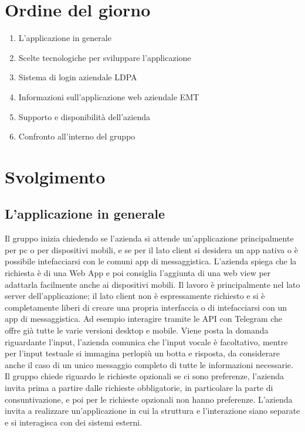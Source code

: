 \documentclass[12pt, a4paper,table]{article}
\begin{document}
	\section{Ordine del giorno}
	\begin{enumerate}
		\item L'applicazione in generale
		\item Scelte tecnologiche per sviluppare l'applicazione
		\item Sistema di login aziendale LDPA
		\item Informazioni sull'applicazione web aziendale EMT
		\item Supporto e disponibilità dell'azienda
		\item Confronto all'interno del gruppo
	\end{enumerate}
	\newpage

	\section{Svolgimento}
		\subsection{L'applicazione in generale}
		Il gruppo inizia chiedendo se l'azienda si attende un'applicazione principalmente 
		per pc o per dispositivi mobili, e se per il lato client si desidera un app nativa 
		o è possibile intefacciarsi con le comuni app di messaggistica. \newline
		L'azienda spiega che la richiesta è di una Web App e poi consiglia l'aggiunta di una 
		web view per adattarla facilmente anche ai dispositivi mobili. Il lavoro è principalmente 
		nel lato server dell'applicazione; il lato client non è espressamente richiesto e si è 
		completamente liberi di creare una propria interfaccia o di intefacciarsi con un app di 
		messaggistica. Ad esempio interagire tramite le API con Telegram che offre già tutte 
		le varie versioni desktop e mobile.\newline
        Viene posta la domanda riguardante l'input, l'azienda comunica che l'input vocale 
		è facoltativo, mentre per l'input testuale si immagina perlopiù un botta e risposta, 
		da considerare anche il caso di un unico messaggio completo di tutte le informazioni necessarie.\newline
		Il gruppo chiede riguardo le richieste opzionali se ci sono preferenze, l'azienda invita 
		prima a partire dalle richieste obbligatorie, in particolare la parte di consuntivazione, 
		e poi per le richieste opzionali non hanno preferenze.
		L'azienda invita a realizzare un'applicazione in cui la struttura e l'interazione siano
		separate e si interagisca con dei sistemi esterni.
		
\end{document}
